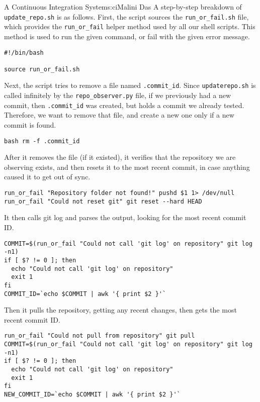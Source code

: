 \begin{aosachapter}{A Continuous Integration System}{s:ci}{Malini Das}
A step-by-step breakdown of \texttt{update\_repo.sh} is as follows.
First, the script sources the \texttt{run\_or\_fail.sh} file, which
provides the \texttt{run\_or\_fail} helper method used by all our shell
scripts. This method is used to run the given command, or fail with the
given error message.

\begin{verbatim}
#!/bin/bash

source run_or_fail.sh 
\end{verbatim}

Next, the script tries to remove a file named \texttt{.commit\_id}.
Since \texttt{updaterepo.sh} is called infinitely by the
\texttt{repo\_observer.py} file, if we previously had a new commit, then
\texttt{.commit\_id} was created, but holds a commit we already tested.
Therefore, we want to remove that file, and create a new one only if a
new commit is found.

\begin{verbatim}
bash rm -f .commit_id 
\end{verbatim}

After it removes the file (if it existed), it verifies that the
repository we are observing exists, and then resets it to the most
recent commit, in case anything caused it to get out of sync.

\begin{verbatim}
run_or_fail "Repository folder not found!" pushd $1 1> /dev/null
run_or_fail "Could not reset git" git reset --hard HEAD
\end{verbatim}

It then calls git log and parses the output, looking for the most recent
commit ID.

\begin{verbatim}
COMMIT=$(run_or_fail "Could not call 'git log' on repository" git log -n1)
if [ $? != 0 ]; then
  echo "Could not call 'git log' on repository"
  exit 1
fi
COMMIT_ID=`echo $COMMIT | awk '{ print $2 }'`
\end{verbatim}

Then it pulls the repository, getting any recent changes, then gets the
most recent commit ID.

\begin{verbatim}
run_or_fail "Could not pull from repository" git pull
COMMIT=$(run_or_fail "Could not call 'git log' on repository" git log -n1)
if [ $? != 0 ]; then
  echo "Could not call 'git log' on repository"
  exit 1
fi
NEW_COMMIT_ID=`echo $COMMIT | awk '{ print $2 }'`
\end{verbatim}


\end{aosachapter}
